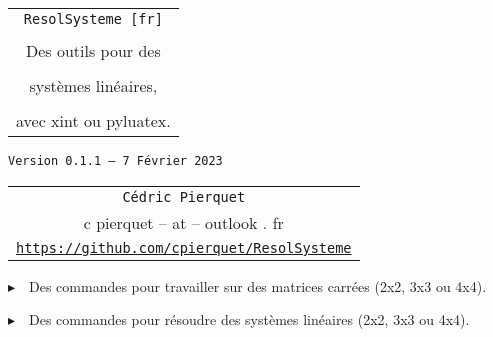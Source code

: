 \documentclass[a4paper,11pt]{article}
\def\TPversion{0.1.1}
\def\TPdate{7 Février 2023}
\begin{document}
\setlength{\aweboxleftmargin}{0.07\linewidth}
\setlength{\aweboxcontentwidth}{0.93\linewidth}
\setlength{\aweboxvskip}{8pt}

\pagestyle{fancy}

\thispagestyle{empty}

\vspace{2cm}

\begin{center}
	\begin{minipage}{0.75\linewidth}
	\begin{tcolorbox}[colframe=yellow,colback=yellow!15]
		\begin{center}
			\begin{tabular}{c}
				{\Huge \texttt{ResolSysteme [fr]}}\\
				\\
				{\LARGE Des outils pour des} \\
				\\
				{\LARGE systèmes linéaires,} \\
				\\
				{\LARGE avec xint ou pyluatex.} \\
			\end{tabular}
			
			\bigskip
			
			{\small \texttt{Version \TPversion{} -- \TPdate}}
		\end{center}
	\end{tcolorbox}
\end{minipage}
\end{center}

\vspace{0.5cm}

\begin{center}
	\begin{tabular}{c}
	\texttt{Cédric Pierquet}\\
	{\ttfamily c pierquet -- at -- outlook . fr}\\
	\texttt{\url{https://github.com/cpierquet/ResolSysteme}}
\end{tabular}
\end{center}

\vspace{0.25cm}

{$\blacktriangleright$~~Des commandes pour travailler sur des matrices carrées (2x2, 3x3 ou 4x4).}

\smallskip

{$\blacktriangleright$~~Des commandes pour résoudre des systèmes linéaires (2x2, 3x3 ou 4x4).}
\end{document}
